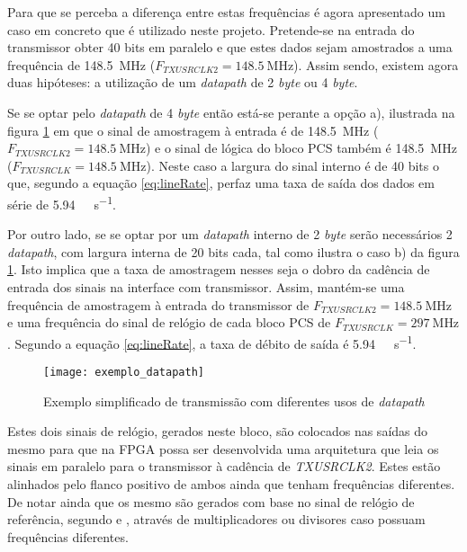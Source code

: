 Para que se perceba a diferença entre estas frequências é agora apresentado um caso em concreto que é utilizado neste projeto. Pretende-se na entrada do transmissor obter 40 bits em paralelo e que estes dados sejam amostrados a uma frequência de \SI{148.5}{\mega\hertz} ($F_{TXUSRCLK2} = \SI{148.5}{\mega\hertz}$). Assim sendo, existem agora duas hipóteses: a utilização de um \textit{datapath} de 2 \textit{byte} ou 4 \textit{byte}.

Se se optar pelo \textit{datapath} de 4 \textit{byte} então está-se perante a opção a), ilustrada na figura \ref{fig:exemplo_datapaths} em que o sinal de amostragem à entrada é de \SI{148.5}{\mega\hertz} ($F_{TXUSRCLK2} = \SI{148.5}{\mega\hertz}$) e o sinal de lógica do bloco PCS também é \SI{148.5}{\mega\hertz} ($F_{TXUSRCLK} = \SI{148.5}{\mega\hertz}$). Neste caso a largura do sinal interno é de 40 bits o que, segundo a equação \ref{eq:lineRate}, perfaz uma taxa de saída dos dados em série de \SI{5.94}{\giga\bit\per\second}.

Por outro lado, se se optar por um \textit{datapath} interno de 2 \textit{byte} serão necessários 2 \textit{datapath}, com largura interna de 20 bits cada, tal como ilustra o caso b) da figura \ref{fig:exemplo_datapaths}. Isto implica que a taxa de amostragem nesses seja o dobro da cadência de entrada dos sinais na interface com transmissor. Assim, mantém-se uma frequência de amostragem à entrada do transmissor de $F_{TXUSRCLK2} = \SI{148.5}{\mega\hertz}$ e uma frequência do sinal de relógio de cada bloco PCS de $F_{TXUSRCLK} = \SI{297}{\mega\hertz} $. Segundo a equação \ref{eq:lineRate}, a taxa de débito de saída é \SI{5.94}{\giga\bit\per\second}.

\begin{figure}[h!]
 	\begin{center}
 		\leavevmode
 		\texttt{[image: exemplo\_datapath]}
 		\caption[Exemplo simplificado de transmissão com diferentes usos de \textit{datapath}]{Exemplo simplificado de transmissão com diferentes usos de \textit{datapath}}
 		\label{fig:exemplo_datapaths}
 	\end{center}
 \end{figure}

Estes dois sinais de relógio, gerados neste bloco, são colocados nas saídas do mesmo para que na FPGA possa ser desenvolvida uma arquitetura que leia os sinais em paralelo para o transmissor à cadência de \textit{TXUSRCLK2}. Estes estão alinhados pelo flanco positivo de ambos ainda que tenham frequências diferentes. De notar ainda que os mesmo são gerados com base no sinal de relógio de referência, segundo \cite{R011} e \cite{R022}, através de multiplicadores ou divisores caso possuam frequências diferentes.


